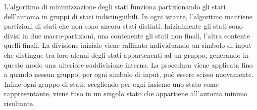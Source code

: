 L'algoritmo di minimizzazione degli stati funziona partizionando gli stati dell'automa in gruppi di stati indistinguibili. 
In ogni istante, l'algoritmo mantiene partizioni di stati che non sono ancora stati distinti.
Inizialmente gli stati sono divisi in due macro-partizioni, una contenente gli stati non finali, l'altra contente quelli finali. La divisione iniziale viene raffinata individuando un simbolo di input che distingue tra loro alcuni degli stati appartenenti ad un gruppo, generando in questo modo una ulteriore suddivisione interna. La procedura viene applicata fino a quando nessun gruppo, per ogni simbolo di input, può essere scisso nuovamente.
Infine ogni gruppo di stati, scegliendo per ogni insieme uno stato come rappresentante, viene fuso in un singolo stato che appartiene all'automa minimo risultante. 

